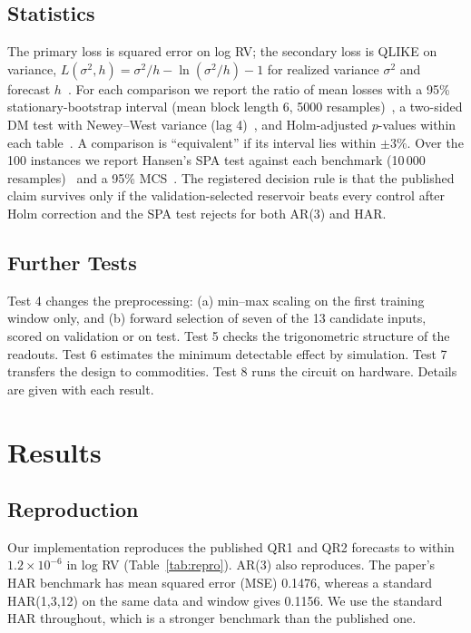 \documentclass{ieeeaccess}
\begin{document}
\subsection{Statistics}
The primary loss is squared error on log RV; the secondary loss is QLIKE on variance, $L(\sigma^2,h)=\sigma^2/h-\ln(\sigma^2/h)-1$ for realized variance $\sigma^2$ and forecast $h$~\cite{patton2011}. For each comparison we report the ratio of mean losses with a 95\% stationary-bootstrap interval (mean block length 6, 5000 resamples)~\cite{politis1994}, a two-sided DM test with Newey--West variance (lag 4)~\cite{diebold1995,newey1987}, and Holm-adjusted $p$-values within each table~\cite{holm1979}. A comparison is ``equivalent'' if its interval lies within $\pm3\%$. Over the 100 instances we report Hansen's SPA test against each benchmark (10\,000 resamples)~\cite{hansen2005} and a 95\% MCS~\cite{hansen2011}. The registered decision rule is that the published claim survives only if the validation-selected reservoir beats every control after Holm correction and the SPA test rejects for both AR(3) and HAR.

\subsection{Further Tests}
Test 4 changes the preprocessing: (a) min--max scaling on the first training window only, and (b) forward selection of seven of the 13 candidate inputs, scored on validation or on test. Test 5 checks the trigonometric structure of the readouts. Test 6 estimates the minimum detectable effect by simulation. Test 7 transfers the design to commodities. Test 8 runs the circuit on hardware. Details are given with each result.

\section{Results}
\label{sec:results}

\subsection{Reproduction}
\label{sec:res-repro}
Our implementation reproduces the published QR1 and QR2 forecasts to within $1.2\times10^{-6}$ in log RV (Table~\ref{tab:repro}). AR(3) also reproduces. The paper's HAR benchmark has mean squared error (MSE) 0.1476, whereas a standard HAR(1,3,12) on the same data and window gives 0.1156. We use the standard HAR throughout, which is a stronger benchmark than the published one.
\end{document}

